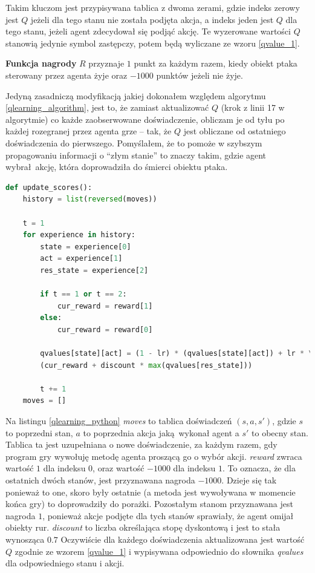 \documentclass[a4paper, 12pt,oneside]{book}
\begin{document}
Takim kluczom jest przypisywana tablica z dwoma zerami, gdzie
indeks zerowy jest $Q$ jeżeli dla tego stanu nie została podjęta akcja,
a indeks jeden jest $Q$ dla tego stanu, jeżeli agent zdecydował się
podjąć akcję. Te wyzerowane wartości $Q$ stanowią jedynie symbol zastępczy,
potem będą wyliczane ze wzoru \ref{qvalue_1}.

\textbf{Funkcja nagrody} $R$ przyznaje $1$ punkt za każdym razem, kiedy obiekt
ptaka sterowany przez agenta żyje oraz $-1000$ punktów jeżeli nie żyje.

Jedyną zasadniczą modyfikacją jakiej dokonałem względem algorytmu
\ref{qlearning_algorithm}, jest to, że zamiast aktualizować $Q$ (krok z linii
17 w algorytmie) co każde zaobserwowane doświadczenie, obliczam je od tyłu po
każdej rozegranej przez agenta grze -- tak, że $Q$ jest obliczane od ostatniego
doświadczenia do pierwszego. Pomyślałem, że to pomoże w szybszym propagowaniu
informacji o ``złym stanie'' to znaczy takim, gdzie agent wybrał akcję, która
doprowadziła do śmierci obiektu ptaka. 
\begin{lstlisting}[language=Python, label={qlearning_python},
caption={Zaimplementowany algorytm Q-Learning}, captionpos=t]
def update_scores():
    history = list(reversed(moves))

    t = 1
    for experience in history:
        state = experience[0]
        act = experience[1]
        res_state = experience[2]

        if t == 1 or t == 2:
            cur_reward = reward[1]
        else:
            cur_reward = reward[0]

        qvalues[state][act] = (1 - lr) * (qvalues[state][act]) + lr * \
	    (cur_reward + discount * max(qvalues[res_state]))

        t += 1
    moves = []
\end{lstlisting}
Na listingu \ref{qlearning_python} \textit{moves} to tablica doświadczeń
$(s, a, s')$, gdzie $s$ to poprzedni
stan, $a$ to poprzednia akcja jaką wykonał agent a $s'$ to obecny stan. Tablica
ta jest uzupełniana o nowe doświadczenie, za każdym razem, gdy program gry 
wywołuję metodę agenta proszącą go o wybór akcji. \textit{reward} zwraca
wartość $1$ dla indeksu $0$, oraz wartość $-1000$ dla indeksu $1$. To oznacza,
że dla ostatnich dwóch stanów, jest przyznawana nagroda $-1000$. Dzieje się tak
ponieważ to one, skoro były ostatnie (a metoda jest wywoływana w momencie końca
gry) to doprowadziły do porażki. Pozostałym stanom przyznawana jest nagroda
$1$, ponieważ akcje podjęte dla tych stanów sprawiały, że agent omijał obiekty
rur. \textit{discount} to liczba określająca stopę dyskontową i jest to
stała wynosząca $0.7$ Oczywiście dla każdego doświadczenia aktualizowana jest
wartość $Q$ zgodnie ze wzorem \ref{qvalue_1} i wypisywana odpowiednio do
słownika \textit{qvalues} dla odpowiedniego stanu i akcji. 
\end{document}
